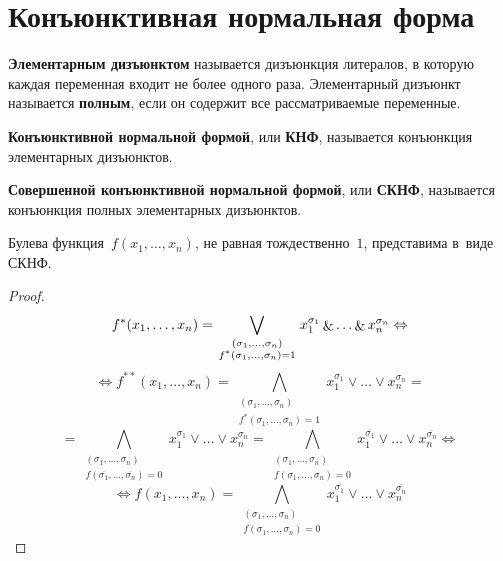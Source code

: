 \section{Конъюнктивная нормальная форма}
 \textbf{Элементарным дизъюнктом} называется дизъюнкция литералов, в которую каждая переменная входит не более одного раза.
Элементарный дизъюнкт называется \textbf{полным}, если он содержит все рассматриваемые переменные.

\textbf{Конъюнктивной нормальной формой}, или \textbf{КНФ}, называется конъюнкция элементарных дизъюнктов.

\textbf{Совершенной конъюнктивной нормальной формой}, или \textbf{СКНФ}, называется конъюнкция полных элементарных дизъюнктов.

\begin{statement}
Булева функция~$f(x_1, \ldots, x_n)$, не равная тождественно~$1$, представима в~виде СКНФ.
\end{statement}
\begin{proof}
\begin{equation*}
f^*(x_1, \ldots, x_n) = \bigvee_{\begin{smallmatrix}
(\sigma_1, \ldots, \sigma_n) \\
f^*(\sigma_1, \ldots, \sigma_n) = 1
\end{smallmatrix}} x_1^{\sigma_1} \mathop{\&} \ldots \mathop{\&} x_n^{\sigma_n} \Leftrightarrow
\end{equation*}
\begin{equation*}
\Leftrightarrow f^{**}(x_1, \ldots, x_n) =
\bigwedge_{\begin{smallmatrix}
(\sigma_1, \ldots, \sigma_n) \\
f^*(\sigma_1, \ldots, \sigma_n) = 1
\end{smallmatrix}} x_1^{\sigma_1} \lor \ldots \lor x_n^{\sigma_n} =
\end{equation*}
\begin{equation*}
= \bigwedge_{\begin{smallmatrix}
(\sigma_1, \ldots, \sigma_n) \\
f(\overline{\sigma_1}, \ldots, \overline{\sigma_n}) = 0
\end{smallmatrix}} x_1^{\sigma_1} \lor \ldots \lor x_n^{\sigma_n} =
\bigwedge_{\begin{smallmatrix}
(\sigma_1, \ldots, \sigma_n) \\
f(\sigma_1, \ldots, \sigma_n) = 0
\end{smallmatrix}} x_1^{\overline{\sigma_1}} \lor \ldots \lor x_n^{\overline{\sigma_n}} \Leftrightarrow
\end{equation*}
\begin{equation*}
\Leftrightarrow f(x_1, \ldots, x_n)
= \bigwedge_{\begin{smallmatrix}
(\sigma_1, \ldots, \sigma_n) \\
f(\sigma_1, \ldots, \sigma_n) = 0
\end{smallmatrix}} x_1^{\overline{\sigma_1}} \lor \ldots \lor x_n^{\overline{\sigma_n}}
\end{equation*}
\end{proof}
